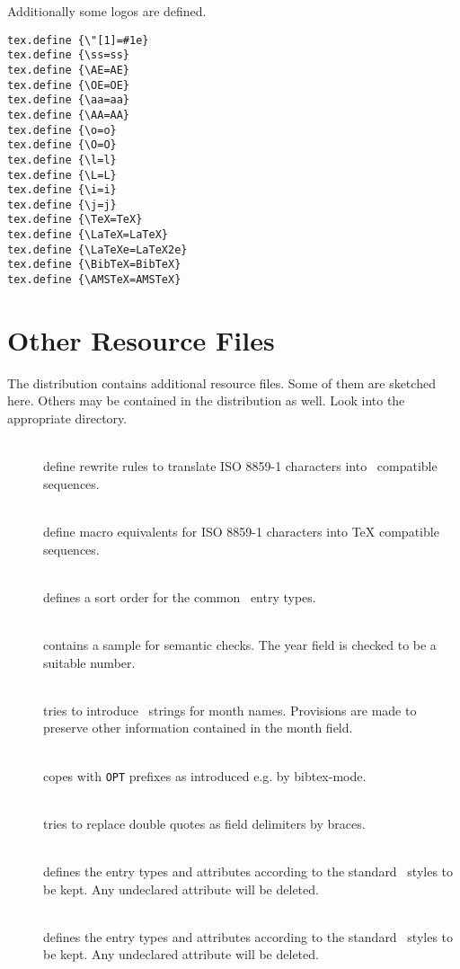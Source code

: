 \documentclass[11pt,a4paper]{scrbook}
\begin{document}
Additionally some logos are defined.
\begin{lstlisting}[language=BibTool]
tex.define {\"[1]=#1e}
tex.define {\ss=ss}
tex.define {\AE=AE}
tex.define {\OE=OE}
tex.define {\aa=aa}
tex.define {\AA=AA}
tex.define {\o=o}
tex.define {\O=O}
tex.define {\l=l}
tex.define {\L=L}
tex.define {\i=i}
tex.define {\j=j}
tex.define {\TeX=TeX}
tex.define {\LaTeX=LaTeX}
tex.define {\LaTeXe=LaTeX2e}
tex.define {\BibTeX=BibTeX}
tex.define {\AMSTeX=AMSTeX}
\end{lstlisting}


\section{Other Resource Files}

The distribution contains additional resource files. Some of them are sketched
here. Others may be contained in the distribution as well. Look into the
appropriate directory.

\begin{description}
\item []\ \\
  define rewrite rules to translate ISO 8859-1 characters into \BibTeX\ 
  compatible sequences.
\item []\ \\
  define macro equivalents for ISO 8859-1 characters into \TeX{} compatible
  sequences.
\item []\ \\
  defines a sort order for the common \BibTeX\ entry types.
\item []\ \\
  contains a sample for semantic checks. The year field is checked to be a
  suitable number.
\item []\ \\
  tries to introduce \BibTeX\ strings for month names.  Provisions are made to
  preserve other information contained in the month field.
\item []\ \\
  copes with \texttt{OPT} prefixes as introduced e.g. by bibtex-mode.
\item [\file{braces}]\ \\
  tries to replace double quotes as field delimiters by braces.
\item []\ \\
  defines the entry types and attributes according to the standard \BibTeX\
  styles to be kept. Any undeclared attribute will be deleted.
\item [\file{keep\_biblatex}]\ \\
  defines the entry types and attributes according to the standard \bibLaTeX\
  styles to be kept. Any undeclared attribute will be deleted.
\end{description}





\ifHTML\else
\ifx\ptt\undefined\global\let\ptt\ttfamily\fi
\ifx\psf\undefined\global\let\psf\sffamily\fi
\ifx\pdollar\undefined\global\let\pdollar\$\fi
\fi
\printindex
\end{document}
